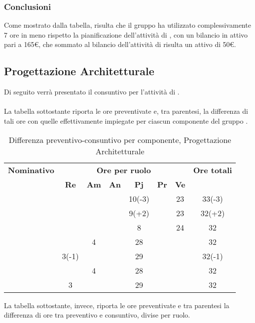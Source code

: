\subsubsection{Conclusioni}
Come mostrato dalla tabella, risulta che il gruppo ha utilizzato complessivamente 7 ore in meno rispetto la pianificazione dell'attività di \textit{\AD}, con un bilancio in attivo pari a 165€, che sommato al bilancio dell'attività di \textit{\AR} risulta un attivo di 50€.

\subsection{Progettazione Architetturale}

Di seguito verrà presentato il consuntivo per l'attività di \textit{\PA}.
\\\\
La tabella sottostante riporta le ore preventivate e, tra parentesi, la differenza di tali ore con quelle effettivamente impiegate per ciascun componente del gruppo \gruppo.

\begin{table}[H]
	\begin{center}
		\begin{tabular}{|c|c|c|c|c|c|c|c|}
			\hline
			\textbf{Nominativo} & \multicolumn{6}{c|}{\textbf{Ore per ruolo}} & \textbf{Ore totali} \\
			& \textbf{Re} & \textbf{Am} & \textbf{An} & \textbf{Pj} & \textbf{Pr} & \textbf{Ve} & \\
			\hline
			\FB			&		&		&		&	10(-3)	&		&	23	&	33(-3)	\\
			\hline
			\AF			&		&		&		&	9(+2) 	&		&	23	& 	32(+2)	\\
			\hline
			\GN			&		&		&		&	8	&		&	24	&	32	\\
			\hline
			\GR			&		&	4	&  		&	28	&	 	& 		&	32	\\
			\hline
			\SM 		&	3(-1)	&		&		&	29	&		& 		&	32(-1)	\\
			\hline
			\MP 		& 		&	4	&		&	28	&		&		&	32	\\
			\hline
			\MV 		&	3	&		&		&	29	&		&		& 	32	\\
			\hline
		\end{tabular}
	\end{center}
	\caption{Differenza preventivo-consuntivo per componente, Progettazione Architetturale}
\end{table}

La tabella sottostante, invece, riporta le ore preventivate e  tra parentesi la differenza di ore tra preventivo e consuntivo, divise per ruolo.

